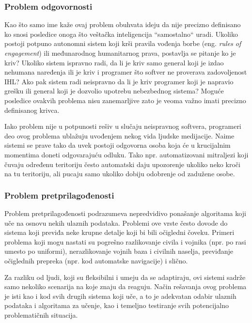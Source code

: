 \documentclass[a4paper]{article}
\begin{document}
\subsubsection{Problem odgovornosti}
\label{subsubsec: Problem odgovornosti}
Kao što samo ime kaže ovaj problem obuhvata ideju da nije precizno definisano ko snosi posledice onoga što veštačka inteligencija ``samostalno`` uradi. Ukoliko postoji potpuno autonomni sistem koji krši pravila vođenja borbe (eng. \emph{rules of engagement}) ili međunarodnog humanitarnog prava, postavlja se pitanje ko je kriv? Ukoliko sistem ispravno radi, da li je kriv samo general koji je izdao nehumana naređenja ili je kriv i programer što softver ne proverava zadovoljenost IHL? Ako pak sistem radi neispravno da li je kriv programer koji je napravio grešku ili general koji je dozvolio upotrebu nebezbednog sistema? Moguće posledice ovakvih problema nisu zanemarljive zato je veoma važno imati precizno definisanog krivca.

Iako problem nije u potpunosti rešiv u slučaju neispravnog softvera, programeri deo ovog problema ublažuju uvođenjem nekog vida ljudske medijacije. Naime sistemi se prave tako da uvek postoji odgovorna osoba koja će u krucijalnim momentima doneti odgovarajuću odluku. Tako npr. automatizovani mitraljezi koji čuvaju određenu teritoriju često automatski daju upozorenje ukoliko neko kroči na tu teritoriju, ali pucaju samo ukoliko dobiju odobrenje od zadužene osobe. \cite{killer_robots} 
\subsubsection{Problem pretprilagođenosti}
\label{subsubsec: Problem pretprilagođenosti}
Problem pretprilagođenosti podrazumeva nepredvidivo ponašanje algoritama koji uče na osnovu nekih ulaznih podataka. Problemi ove vrste često dovode do sistema koji previđa neke krupne detalje koji bi bili očigledni čoveku. Primeri problema koji mogu nastati su pogrešno razlikovanje civila i vojnika (npr. po rasi umesto po uniformi), nerazlikovanje vojnih baza i civilnih naselja, previđanje očiglednih prepreka (npr. kod automatske navigacije) i slično.

Za razliku od ljudi, koji su fleksibilni i umeju da se adaptiraju, ovi sistemi sadrže samo nekoliko scenarija na koje znaju da reaguju. Način rešavanja ovog problema je isti kao i kod svih drugih sistema koji uče, a to je adekvatan odabir ulaznih podataka i algoritama za učenje, kao i temeljno testiranje svih potencijalno problematičnih situacija.
\end{document}
